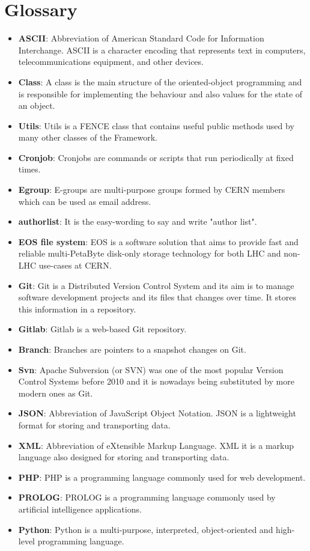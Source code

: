 \section*{Glossary}
\label{sec:Glossary}

\begin{itemize}
\item \textbf{ASCII}: Abbreviation of American Standard Code for Information Interchange. ASCII is a character encoding that represents text in computers, telecommunications equipment\textbf{}, and other devices.
\item \textbf{Class}: A class is the main structure of the oriented-object programming and is responsible for implementing the behaviour and also values for the state of an object.
\item \textbf{Utils}: Utils is a FENCE class that contains useful public methods used by many other classes of the Framework.
\item \textbf{Cronjob}: Cronjobs are commands or scripts that run periodically at fixed times.
\item \textbf{Egroup}: E-groups are multi-purpose groups formed by CERN members which can be used as email address.
\item \textbf{authorlist}: It is the easy-wording to say and write "author list". 
\item \textbf{EOS file system}: EOS is a software solution that aims to provide fast and reliable multi-PetaByte disk-only storage technology for both LHC and non-LHC use-cases at CERN.
\item \textbf{Git}: Git is a Distributed Version Control System and its aim is to manage software development projects and its files that changes over time. It stores this information in a repository.
\item \textbf{Gitlab}: Gitlab is a web-based Git repository.
\item \textbf{Branch}: Branches are pointers to a snapshot changes on Git.
\item \textbf{Svn}: Apache Subversion (or SVN) was one of the most popular Version Control Systems before 2010 and it is nowadays being substituted by more modern ones as Git.
\item \textbf{JSON}: Abbreviation of JavaScript Object Notation. JSON is a lightweight format for storing and transporting data.
\item \textbf{XML}: Abbreviation of eXtensible Markup Language. XML it is a markup language also designed for storing and transporting data.
\item \textbf{PHP}: PHP is a programming language commonly used for web development.
\item \textbf{PROLOG}: PROLOG is a programming language commonly used by artificial intelligence applications.
\item \textbf{Python}: Python is a multi-purpose, interpreted, object-oriented and high-level programming language.
\end{itemize}


